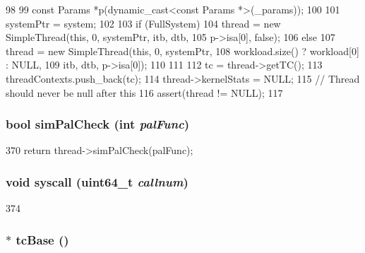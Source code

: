 \begin{DoxyCode}
98 {
99     const Params *p(dynamic_cast<const Params *>(_params));
100 
101     systemPtr = system;
102 
103     if (FullSystem) {
104         thread = new SimpleThread(this, 0, systemPtr, itb, dtb,
105                                   p->isa[0], false);
106     } else {
107         thread = new SimpleThread(this, 0, systemPtr,
108                                   workload.size() ? workload[0] : NULL,
109                                   itb, dtb, p->isa[0]);
110     }
111 
112     tc = thread->getTC();
113     threadContexts.push_back(tc);
114     thread->kernelStats = NULL;
115     // Thread should never be null after this
116     assert(thread != NULL);
117 }
\end{DoxyCode}
\hypertarget{classCheckerCPU_a461205960be9d52e9beda48a77e9c600}{
\subsubsection[{simPalCheck}]{\setlength{\rightskip}{0pt plus 5cm}bool simPalCheck (int {\em palFunc})}}
\label{classCheckerCPU_a461205960be9d52e9beda48a77e9c600}



\begin{DoxyCode}
370 { return thread->simPalCheck(palFunc); }
\end{DoxyCode}
\hypertarget{classCheckerCPU_a3ef5bd684f938b4a925d4a9e7e1d4f94}{
\subsubsection[{syscall}]{\setlength{\rightskip}{0pt plus 5cm}void syscall (uint64\_\-t {\em callnum})}}
\label{classCheckerCPU_a3ef5bd684f938b4a925d4a9e7e1d4f94}



\begin{DoxyCode}
374 { }
\end{DoxyCode}
\hypertarget{classCheckerCPU_ad33756f3e96ee445dca8d69b1dd8709c}{
\subsubsection[{tcBase}]{$\ast$ tcBase ()}}
\label{classCheckerCPU_ad33756f3e96ee445dca8d69b1dd8709c}



